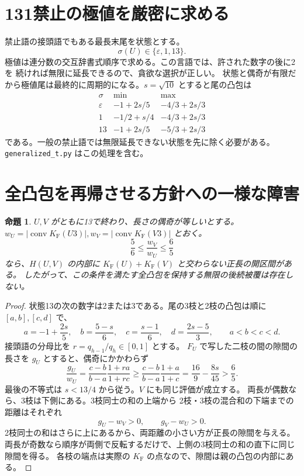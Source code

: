 \documentclass[10pt,a4paper]{article}
\newcommand{\KF}{K_{\mathrm F}}
\newcommand{\conv}{\operatorname{conv}}
\newcommand{\eps}{\varepsilon}
\newtheorem{proposition}[theorem]{命題}
\begin{document}
\section{131禁止の極値を厳密に求める}
禁止語の接頭語でもある最長末尾を状態とする。
\[
 \sigma(U)\in\{\eps,1,13\}.
\]
極値は連分数の交互辞書式順序で求める。この言語では、許された数字の後に2を
続ければ無限に延長できるので、貪欲な選択が正しい。
状態と偶奇が有限だから極値尾は最終的に周期的になる。$s=\sqrt{10}$ とすると尾の凸包は
\[
\begin{array}{c|cc}
\sigma&\min&\max\\\hline
\eps&-1+2s/5&-4/3+2s/3\\
1&-1/2+s/4&-4/3+2s/3\\
13&-1+2s/5&-5/3+2s/3
\end{array}
\]
である。一般の禁止語では無限延長できない状態を先に除く必要がある。
\texttt{generalized\_t.py} はこの処理を含む。

\section{全凸包を再帰させる方針への一様な障害}
\begin{proposition}\label{prop:obstruction}
$U,V$ がともに13で終わり、長さの偶奇が等しいとする。
$w_U=|\conv\KF(U3)|, w_V=|\conv\KF(V3)|$ とおく。
\[
 \frac56\le\frac{w_V}{w_U}\le\frac65
\]
なら、$H(U,V)$ の内部に $\KF(U)+\KF(V)$ と交わらない正長の開区間がある。
したがって、この条件を満たす全凸包を保持する無限の後続被覆は存在しない。
\end{proposition}
\begin{proof}
状態13の次の数字は2または3である。尾の3枝と2枝の凸包は順に $[a,b],[c,d]$ で、
\[
 a=-1+\frac{2s}{5},\quad b=\frac{5-s}{6},\quad
 c=\frac{s-1}{6},\quad d=\frac{2s-5}{3},\qquad a<b<c<d.
\]
接頭語の分母比を $r=q_{h-1}/q_h\in[0,1]$ とする。
$F_U$ で写した二枝の間の隙間の長さを $g_U$ とすると、偶奇にかかわらず
\[
 \frac{g_U}{w_U}=\frac{c-b}{b-a}\frac{1+ra}{1+rc}
 \ge\frac{c-b}{b-a}\frac{1+a}{1+c}
 =\frac{16}{9}-\frac{8s}{45}>\frac65.
\]
最後の不等式は $s<13/4$ から従う。$V$ にも同じ評価が成立する。
両長が偶数なら、3枝は下側にある。3枝同士の和の上端から
2枝・3枝の混合和の下端までの距離はそれぞれ
\[
 g_U-w_V>0,\qquad g_V-w_U>0.
\]
2枝同士の和はさらに上にあるから、両距離の小さい方が正長の隙間を与える。
両長が奇数なら順序が両側で反転するだけで、上側の3枝同士の和の直下に同じ隙間を得る。
各枝の端点は実際の $\KF$ の点なので、隙間は親の凸包の内部にある。
\end{proof}
\end{document}
